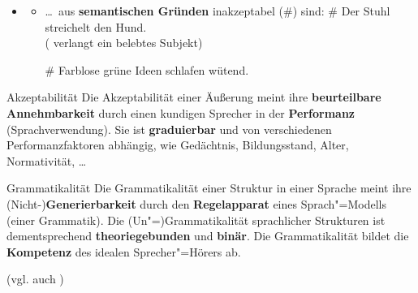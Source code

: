 \begin{frame}

\begin{itemize}
	\item[]
	
	\begin{itemize}
		
		\item \dots\ aus \textbf{semantischen Gründen} inakzeptabel (\#) sind:
		\ea \# Der Stuhl streichelt den Hund.\\
		( verlangt ein belebtes Subjekt)
		\z
		
		\ea \# Farblose grüne Ideen schlafen wütend. \hfill 
		\citep{Chomsky57x}
		\z
		
	\end{itemize}

\end{itemize}
\nocite{Coseriu88a, Fries15a, Repp&Co15a}
\end{frame}


\begin{frame}

\begin{block}{Akzeptabilität}
Die Akzeptabilität einer Äußerung meint ihre \textbf{beurteilbare Annehmbarkeit} durch einen kundigen Sprecher in der \textbf{Performanz} (Sprachverwendung). Sie ist \textbf{graduierbar} und von verschiedenen Performanzfaktoren abhängig, wie \zB Gedächtnis, Bildungsstand, Alter, Normativität, \dots\ 

\hfill \citep[vgl.][]{Fries&MyP16b}

\end{block}

%
%

\pause 

\begin{block}{Grammatikalität}
Die Grammatikalität einer Struktur in einer Sprache meint ihre (Nicht-)\textbf{Generierbarkeit} durch den \textbf{Regelapparat} eines Sprach"=Modells (einer Grammatik). Die (Un"=)Grammatikalität sprachlicher Strukturen ist dementsprechend \textbf{theoriegebunden} und \idR \textbf{binär}. 
Die Grammatikalität bildet die \textbf{Kompetenz} des idealen Sprecher"=Hörers ab. \hfill \citep[vgl.][]{Fries16a}
\end{block}

(vgl. auch \citealp{Haider11a})

\end{frame}


